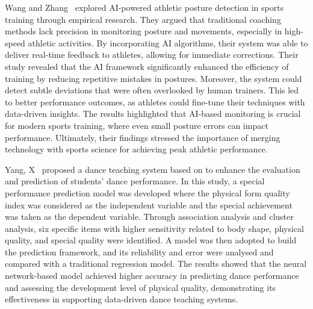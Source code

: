 Wang and Zhang~\cite{wang2024posture} explored AI-powered athletic posture detection in sports training through empirical research. They argued that traditional coaching methods lack precision in monitoring 
posture and movements, especially in high-speed athletic activities. By incorporating AI 
algorithms, their system was able to deliver real-time feedback to athletes, allowing for  
immediate corrections. Their study revealed that the AI framework significantly enhanced the 
efficiency of training by reducing repetitive mistakes in postures. Moreover, the system could 
detect subtle deviations that were often overlooked by human trainers. This led to better 
performance outcomes, as athletes could fine-tune their techniques with data-driven insights. 
The results highlighted that AI-based monitoring is crucial for modern sports training, where 
even small posture errors can impact performance. Ultimately, their findings stressed the 
importance of merging technology with sports science for achieving peak athletic performance. 

Yang, X~\cite{yang2022dance} proposed a dance teaching system based on to enhance the evaluation and 
prediction of students’ dance performance. In this study, a special performance prediction 
model was developed where the physical form quality index was considered as the independent 
variable and the special achievement was taken as the dependent variable. Through association 
analysis and cluster analysis, six specific items with higher sensitivity related to body shape, 
physical quality, and special quality were identified. A model was then adopted to build the 
prediction framework, and its reliability and error were analysed and compared with a 
traditional regression model. The results showed that the neural network-based model achieved 
higher accuracy in predicting dance performance and assessing the development level of 
physical quality, demonstrating its effectiveness in supporting data-driven dance teaching 
systems.








